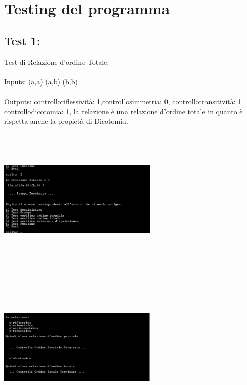 \documentclass[11pt, a4paper, titlepage, block]{article}
\begin{document}
	\newpage
	\section{Testing del programma}
	\subsection{Test 1:}
	Test di Relazione d'ordine Totale.\\
	\\
	Inputs: (a,a) (a,b) (b,b) \\
	\\
	Outputs: controlloriflessivit\`a: 1,controllosimmetria: 0, controllotransitivit\`a: 1
	controllodicotomia: 1, la relazione \`e una relazione d'ordine totale in quanto \`e rispetta anche la propiet\`a di Dicotomia.\\
	\includegraphics[width=3in,height=3in,viewport=0 0 300 300]{../Screenshots/Test1Input.jpg}
	\\
	\includegraphics[width=3in,height=3in,viewport=0 0 300 300]{../Screenshots/Test1Output.png}
	\newpage
\end{document}
